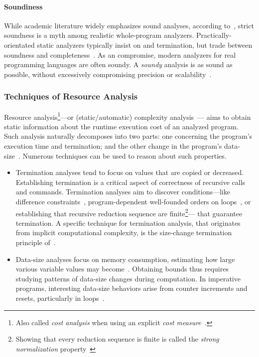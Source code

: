 \paragraph*{Soundiness}
While academic literature widely emphasizes sound analyses, according to~\textcite{livshits2015}, strict soundness is a myth among realistic whole-program analyzers.
Practically-orientated static analyzers typically insist on  and termination,
but trade between soundness and completeness~\cite{moller2023,steffen2020}.
As an compromise, modern analyzers for real programming languages are often soundy.
A \emph{soundy} analysis is as sound as possible, without excessively compromising precision or scalability~\cite{livshits2015}.

\subsubsection{Techniques of Resource Analysis}\label{resource-analysis}

Resource analysis\footnote{
Also called \emph{cost analysis} when using an explicit \emph{cost measure}~\cite{albert2008}.
}---or (static/automatic) {complexity analysis}~\cite{rosendahl1989,leivant2013}---%
aims to obtain static information about the runtime {execution cost} of an analyzed program.
Such analysis naturally decomposes into two parts: one concerning the program's execution time and termination;
and the other change in the program's data-size~\cite{jones2009}.
Numerous techniques can be used to reason about such properties.

\begin{itemize}
\item Termination analyses tend to focus on values that are copied or decreased.
      Establishing termination is a critical aspect of correctness of recursive calls and commands.
      Termination analyses aim to discover conditions---like difference constraints~\cite{sinn2017},
      program-dependent well-founded orders on loops~\cite{lee2001}, or
      establishing that recursive reduction sequence are finite\footnote{
      Showing that every reduction sequence is finite is called the \emph{strong normalization} property~\cite[p. 36]{bertot2004}}---
      that guarantee termination.
      A specific technique for termination analysis, that originates from implicit computational complexity, is the size-change termination principle of~\textcite{lee2001}.
\item Data-size analyses focus on memory consumption, estimating how large various variable values may become~\cite{lommen2023}.
      Obtaining bounds thus requires studying patterns of data-size changes during computation.
      In imperative programs, interesting data-size behaviors arise from counter increments and resets, particularly in loops~\cite{sinn2017,benamram2020}.
\end{itemize}


